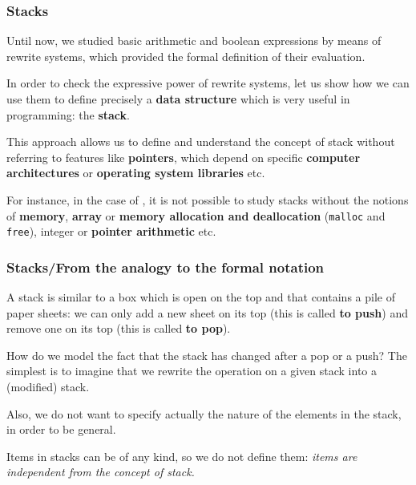
%
\begin{frame}
\frametitle{Stacks}

Until now, we studied basic arithmetic and boolean expressions by
means of rewrite systems, which provided the formal definition of their
evaluation.

\bigskip

In order to check the expressive power of rewrite systems, let us show
how we can use them to define precisely a \textbf{data structure}
which is very useful in programming: the \textbf{stack}.

\bigskip

This approach allows us to define and understand the concept of stack
without referring to features like \textbf{pointers}, which depend on
specific \textbf{computer architectures} or \textbf{operating system
 libraries} etc.

\bigskip

For instance, in the case of \C, it is not possible to study stacks
without the notions of \textbf{memory}, \textbf{array} or
\textbf{memory allocation and deallocation} (\texttt{malloc} and
\texttt{free}), integer or \textbf{pointer arithmetic} etc.

\end{frame}

%
\begin{frame}
\frametitle{Stacks/From the analogy to the formal notation}

A stack is similar to a box which is open on the top and that contains
a pile of paper sheets: we can only add a new sheet on its top (this
is called \textbf{to push}) and remove one on its top (this is called
\textbf{to pop}).

\bigskip

How do we model the fact that the stack has changed after a pop or a
push? The simplest is to imagine that we rewrite the operation on a
given stack into a (modified) stack.

\bigskip

Also, we do not want to specify actually the nature of the elements in
the stack, in order to be general.

\bigskip

Items in stacks can be of any kind, so we do not define them:
\emph{items are independent from the concept of stack.}

\end{frame}

